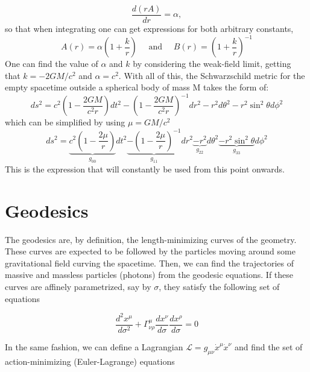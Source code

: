 \documentclass[letterpaper,11pt,onecolumn]{article}
\begin{document}
 \begin{equation}
\frac{d(r A)}{d r}=\alpha, \nonumber
\end{equation}
so that when integrating one can get expressions for both arbitrary constants,
\begin{equation}
A(r)=\alpha\left(1+\frac{k}{r}\right) \quad \text { and } \quad B(r)=\left(1+\frac{k}{r}\right)^{-1} \nonumber
\end{equation}
One can find the value of $\alpha$ and $k$ by considering the weak-field limit, getting that $k=-2 G M / c^{2}$ and $\alpha=c^{2}$. With all of this, the Schwarzschild metric for the empty spacetime outside a spherical body of mass M takes the form of: 
\begin{equation}
d s^{2}=c^{2}\left(1-\frac{2 G M}{c^{2} r}\right) d t^{2}-\left(1-\frac{2 G M}{c^{2} r}\right)^{-1} d r^{2}-r^{2} d \theta^{2}-r^{2} \sin ^{2} \theta d \phi^{2}\nonumber
\end{equation}
which can be simplified by using $\mu=GM/c^2$
\begin{equation}
d s^{2}=\underbrace{c^{2}\left(1-\frac{2 \mu}{r}\right)}_{g_{00}} d t^{2} \underbrace{-\left(1-\frac{2 \mu}{r}\right)^{-1}}_{g_{11}} d r^{2}\underbrace{-r^{2}}_{g_{22}} d \theta^{2}\underbrace{-r^{2} \sin ^{2}\theta}_{g_{33}}  d \phi^{2}
\label{metric}
\end{equation}
This is the expression that will constantly be used from this point onwards.

\section{Geodesics}


The geodesics are, by definition, the length-minimizing curves of the geometry. These curves are expected to be followed by the particles moving around some gravitational field curving the spacetime. Then, we can find the trajectories of massive and massless particles (photons) from the geodesic equations. If these curves are affinely parametrized, say by $\sigma$, they satisfy the following set of equations

\begin{equation}
    \frac{d^2 x^\mu}{d\sigma^2} + \Gamma^{\mu}_{\nu \rho} \frac{dx^\nu}{d\sigma} \frac{dx^\rho}{d\sigma} = 0
\end{equation}

In the same fashion, we can define a Lagrangian $\mathcal{L} = g_{\mu \nu}  \dot{x}^\mu \dot{x}^\nu$ and find the set of action-minimizing (Euler-Lagrange) equations
\end{document}
